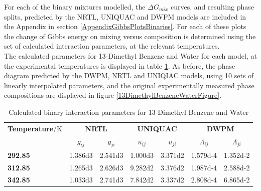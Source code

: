 \clearpage 

For each of the binary mixtures modelled, the $\Delta G_{mix}$ curves, and resulting phase splits, predicted by the NRTL, UNIQUAC and DWPM models are included in the Appendix in section \ref{AppendixGibbsPlotsBinaries}. For each of these plots the change of Gibbs energy on mixing versus composition is determined using the set of calculated interaction parameters, at the relevant temperatures. \\



The calculated parameters for 13-Dimethyl Benzene and Water for each model, at the experimental temperatures is displayed in table \ref{13DimethylBenzeneWaterTable}. As before, the phase diagram predicted by the DWPM, NRTL and UNIQIAC models, using 10 sets of linearly interpolated parameters, and the original experimentally measured phase compositions are displayed in figure \ref{13DimethylBenzeneWaterFigure}.\\

\begin{landscape}
\vspace*{\fill}
\begin{table}[h]
\caption{Calculated binary interaction parameters for 13-Dimethyl Benzene and Water}
\centering
\begin{tabular}{lcccccc}
\toprule
\textbf{Temperature}/$\mathrm{K}$&\multicolumn{2}{c}{\textbf{NRTL}}&\multicolumn{2}{c}{\textbf{UNIQUAC}}&\multicolumn{2}{c}{\textbf{DWPM}}\\
\cmidrule(r){2-7}
&$g_{ij}$&$g_{ji}$&$u_{ij}$&$u_{ji}$&$\Lambda_{ij}$&$\Lambda_{ji}$\\
\midrule
\textbf{ 292.85 } & \num{1.386d3} & \num{2.541d3} & \num{1.000d3} & \num{3.371d2} & \num{1.579d-4} & \num{1.352d-2}\\
\textbf{ 312.85 } & \num{1.265d3} & \num{2.626d3} & \num{9.282d2} & \num{3.376d2} & \num{1.987d-4} & \num{2.588d-2}\\
\textbf{ 342.85 } & \num{1.033d3} & \num{2.741d3} & \num{7.842d2} & \num{3.337d2} & \num{2.808d-4} & \num{6.865d-2}\\
\bottomrule
\end{tabular}\\
\label{13DimethylBenzeneWaterTable}
\end{table}
\vspace*{\fill}
\end{landscape}

